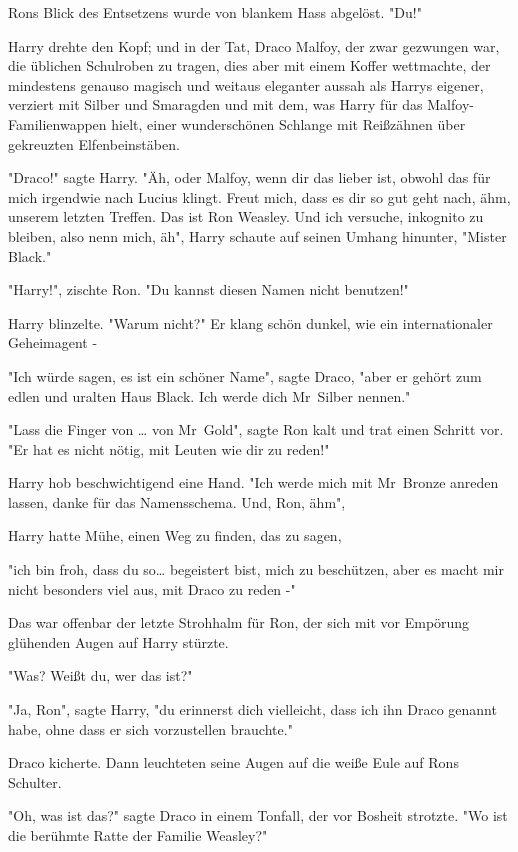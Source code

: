 {Rons Blick des Entsetzens wurde von blankem Hass abgelöst. "Du!"

Harry drehte den Kopf; und in der Tat, Draco Malfoy, der zwar gezwungen war, die üblichen Schulroben zu tragen, dies aber mit einem Koffer wettmachte, der mindestens genauso magisch und weitaus eleganter aussah als Harrys eigener, verziert mit Silber und Smaragden und mit dem, was Harry für das Malfoy-Familienwappen hielt, einer wunderschönen Schlange mit Reißzähnen über gekreuzten Elfenbeinstäben.

"Draco!" sagte Harry. "Äh, oder Malfoy, wenn dir das lieber ist, obwohl das für mich irgendwie nach Lucius klingt. Freut mich, dass es dir so gut geht nach, ähm, unserem letzten Treffen. Das ist Ron Weasley. Und ich versuche, inkognito zu bleiben, also nenn mich, äh", Harry schaute auf seinen Umhang hinunter, "Mister Black."

"Harry!", zischte Ron. "Du kannst diesen Namen nicht benutzen!"

Harry blinzelte. "Warum nicht?" Er klang schön dunkel, wie ein internationaler Geheimagent -

"Ich würde sagen, es ist ein schöner Name", sagte Draco, "aber er gehört zum edlen und uralten Haus Black. Ich werde dich Mr~Silber nennen."

"Lass die Finger von … von Mr~Gold", sagte Ron kalt und trat einen Schritt vor. "Er hat es nicht nötig, mit Leuten wie dir zu reden!"

Harry hob beschwichtigend eine Hand. "Ich werde mich mit Mr~Bronze anreden lassen, danke für das Namensschema. Und, Ron, ähm",

Harry hatte Mühe, einen Weg zu finden, das zu sagen,

"ich bin froh, dass du so… begeistert bist, mich zu beschützen, aber es macht mir nicht besonders viel aus, mit Draco zu reden -"

Das war offenbar der letzte Strohhalm für Ron, der sich mit vor Empörung glühenden Augen auf Harry stürzte.

"Was? Weißt du, wer das ist?"

"Ja, Ron", sagte Harry, "du erinnerst dich vielleicht, dass ich ihn Draco genannt habe, ohne dass er sich vorzustellen brauchte."

Draco kicherte. Dann leuchteten seine Augen auf die weiße Eule auf Rons Schulter.

"Oh, was ist das?" sagte Draco in einem Tonfall, der vor Bosheit strotzte. "Wo ist die berühmte Ratte der Familie Weasley?"

}
